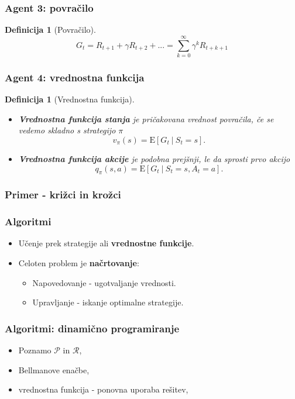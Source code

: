 \documentclass{beamer}    %
\newtheorem{definicija}[izrek]{Definicija}
\begin{document}
\begin{frame}
    \frametitle{Agent 3: povračilo}
    \begin{definicija}[Povračilo]
        $$
        G_t = R_{t+1} + \gamma R_{t+2} + ... = \sum_{k=0}^\infty \gamma^k R_{t + k + 1}
        $$
    \end{definicija}
\end{frame}


\begin{frame}
    \frametitle{Agent 4: vrednostna funkcija}
    \begin{definicija}[Vrednostna funkcija]
        \begin{itemize}
            \item \textbf{Vrednostna funkcija stanja} je pričakovana vrednost povračila, če se 
                    vedemo skladno s strategijo $\pi$ 
                    $$
                    v_\pi(s) = \mathrm{E} [G_t~|~S_t = s].
                    $$
            \item \textbf{Vrednostna funkcija akcije} je podobna prejšnji, le da sprosti prvo akcijo 
                    $$
                    q_\pi(s, a) = \mathrm{E} [G_t~|~S_t = s, A_t = a].
                    $$
        \end{itemize}
    \end{definicija}
\end{frame}


\begin{frame}
    \frametitle{Primer - križci in krožci}
\end{frame}


\begin{frame}
    \frametitle{Algoritmi}
    \begin{itemize}
        \item Učenje prek strategije ali \textbf{vrednostne funkcije}. 
        \item Celoten problem je \textbf{načrtovanje}:
        \begin{itemize}
            \item Napovedovanje - ugotvaljanje vrednosti.
            \item Upravljanje - iskanje optimalne strategije. 
        \end{itemize}
    \end{itemize}
\end{frame}


\begin{frame}
    \frametitle{Algoritmi: dinamično programiranje}
    \begin{itemize}
        \item Poznamo $\mathcal{P}$ in $\mathcal{R}$, 
        \item Bellmanove enačbe, 
        \item vrednostna funkcija - ponovna uporaba rešitev,  
    \end{itemize}
\end{frame}
\end{document}
